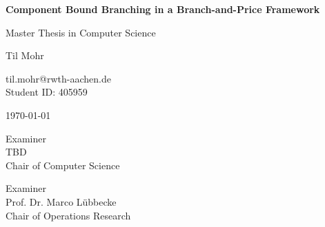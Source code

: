 \documentclass[
	12pt, %
	a4paper, %
	twoside, %
]{report}
\begin{document}
\begin{titlepage}
	\centering
	{\Huge\bfseries Component Bound Branching in a Branch-and-Price Framework\par}
	\vspace{0.85cm}
	{\LARGE Master Thesis in Computer Science\par}
	\vspace{2cm}
	{\LARGE Til Mohr\par}
	\vspace{0.5cm}
	{\large til.mohr@rwth-aachen.de\\Student ID: 405959\par}
	\vspace{2cm}
	{\large \today\par}
	\vspace{2cm}
	\begin{minipage}{0.48\textwidth}
		\centering
		 Examiner\\
		TBD\\
		Chair of Computer Science
	\end{minipage}
	\begin{minipage}{0.48\textwidth}
		\centering
		 Examiner\\
		Prof. Dr. Marco Lübbecke\\
		Chair of Operations Research
	\end{minipage}
\end{titlepage}


\end{document}
